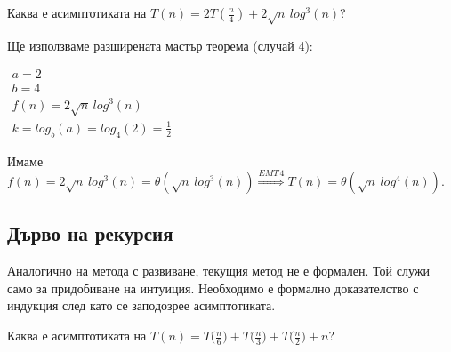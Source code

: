 \begin{problem}
	Каква е асимптотиката на $T(n)=2T(\frac n4)+2\sqrt n\,log^3(n)$?
\end{problem}

\begin{solution}
	Ще използваме $\hyperref[th:extended-master-theorem]{\text{разширената мастър теорема}}$ (случай 4):
	\begin{center}
		$\begin{array}{|l}
			a=2\\
			b=4\\
			f(n)=2\sqrt n\,log^3(n)\\
			k=log_b(a)=log_4(2)=\frac12
		\end{array}$
	\end{center}
	Имаме $f(n)=2\sqrt n\,log^3(n)=\theta(\sqrt n\,log^3(n))\overset{EMT\,4}{\Longrightarrow}T(n)=\theta(\sqrt n\,log^4(n))$.
\end{solution}\leavevmode\newline


\subsection{Дърво на рекурсия}

Аналогично на метода с развиване, текущия метод не е формален. Той служи само за придобиване на интуиция. Необходимо е формално доказателство с индукция след като се заподозрее асимптотиката.

\begin{problem}
	Каква е асимптотиката на $T(n)=T\big(\frac n6\big)+T\big(\frac n3\big)+T\big(\frac n2\big)+n$?
\end{problem}


